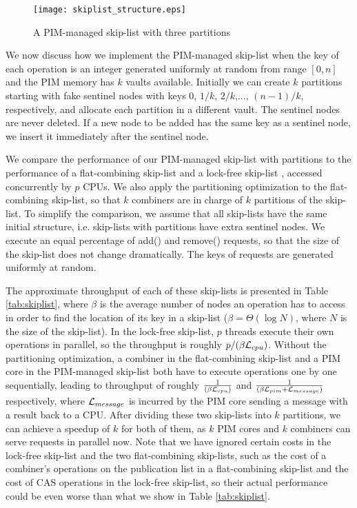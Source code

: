 \begin{figure}[ht!]
\centering
\texttt{[image: skiplist\_structure.eps]}
\caption{A PIM-managed skip-list with three partitions}
\label{figure:skiplist_structure}
\end{figure}

We now discuss how we implement the PIM-managed skip-list
when the key of each operation is an integer generated uniformly at random
from range $[0, n]$ and the PIM memory has $k$ vaults available.
Initially we can create $k$ partitions starting with fake sentinel nodes
with keys $0$, $1/k$, $2/k$,..., $(n-1)/k$, respectively, 
and allocate each partition in a different vault. 
The sentinel nodes are never deleted.
If a new node to be added has the same key as a sentinel node,
we insert it immediately after the sentinel node.

We compare the performance of our PIM-managed skip-list with partitions 
to the performance of a flat-combining skip-list \cite{Hendler10}
and a lock-free skip-list \cite{Herlihy08}, 
accessed concurrently by $p$ CPUs.
We also apply the partitioning optimization to the flat-combining skip-list, 
so that $k$ combiners are in charge of $k$ partitions of the skip-list. 
To simplify the comparison, we assume that all skip-lists have the same
initial structure, i.e. skip-lists with partitions have extra sentinel nodes.
We execute an equal percentage of add() and remove() requests, so that the size of the 
skip-list does not change dramatically. 
The keys of requests are generated uniformly at random. 

The approximate throughput of each of these skip-lists is presented in Table \ref{tab:skiplist}, 
where $\beta$ is the average number of nodes an operation has to access 
in order to find the location of its key in a skip-list
($\beta = \Theta(\log N)$, where $N$ is the size of the skip-list).
In the lock-free skip-list, $p$ threads execute their own operations in parallel, 
so the throughput is roughly $p/(\beta\mathcal{L}_{cpu})$. 
Without the partitioning optimization, a combiner in the flat-combining skip-list and a PIM core 
in the PIM-managed skip-list both have to execute operations one by one sequentially, 
leading to throughput of roughly ${1 \over (\beta\mathcal{L}_{cpu})}$ and ${1 \over (\beta\mathcal{L}_{pim} + \mathcal{L}_{message})}$ respectively, 
where $\mathcal{L}_{message}$ is incurred by the PIM core sending a message with a result back to a CPU. 
After dividing these two skip-lists into $k$ partitions, we can achieve a speedup of $k$ for both of them, 
as $k$ PIM cores and $k$ combiners can serve requests in parallel now. 
Note that we have ignored certain costs in the lock-free skip-list and the two flat-combining skip-lists, 
such as the cost of a combiner's operations on the publication list in a flat-combining skip-list
and the cost of CAS operations in the lock-free skip-list, 
so their actual performance could be even worse than what we show in Table \ref{tab:skiplist}.  

